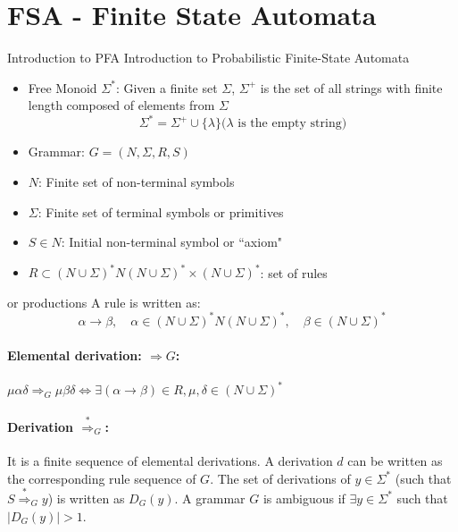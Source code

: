 \section{FSA - Finite State Automata}
Introduction to PFA
Introduction to Probabilistic Finite-State Automata
\begin{itemize}
   \item Free Monoid $\Sigma^*$: Given a finite set $\Sigma$, $\Sigma^+$ is the set of all strings with finite length composed of elements from $\Sigma$
   \begin{equation}
      \Sigma^* = \Sigma^+ \cup \{\lambda\} \text{($\lambda$ is the empty string)}
   \end{equation}
   \item Grammar: $G = (N, \Sigma, R, S)$
\end{itemize}
\begin{itemize}
   \item $N$: Finite set of non-terminal symbols
   \item $\Sigma$: Finite set of terminal symbols or primitives
   \item $S \in N$: Initial non-terminal symbol or ``axiom"
   \item $R \subset (N \cup \Sigma)^*N(N \cup \Sigma)^* \times (N \cup \Sigma)^*$: set of rules
\end{itemize} or productions
A rule is written as:
\begin{equation}
   \alpha \rightarrow \beta,\quad \alpha \in (N \cup \Sigma)^*N(N \cup \Sigma)^*, \quad \beta \in (N \cup \Sigma)^*
\end{equation}

\paragraph*{Elemental derivation: $\Rightarrow G$:}
$\mu \alpha \delta \Rightarrow_G \mu \beta \delta \iff \exists(\alpha \rightarrow \beta) \in R, \mu, \delta \in (N \cup \Sigma)^*$

\paragraph*{Derivation $\stackrel{*}{\Rightarrow}_G$:}
It is a finite sequence of elemental derivations.
A derivation $d$ can be written as the corresponding rule sequence of $G$.
The set of derivations of $y \in \Sigma^*$ (such that $S \stackrel{*}{\Rightarrow}_G y$) is written as $D_G(y)$.
A grammar $G$ is ambiguous if $\exists y \in \Sigma^*$ such that $|D_G(y)| > 1$.

